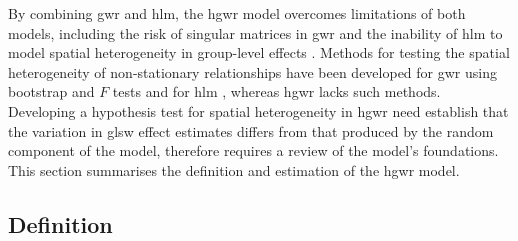 \documentclass[times]{interact}
\theoremstyle{plain}%
\theoremstyle{definition}
\theoremstyle{remark}
\begin{document}
By combining \gls{gwr} and \gls{hlm}, the \gls{hgwr} model overcomes limitations of both models, including the risk of singular matrices in \gls{gwr} and the inability of \gls{hlm} to model spatial heterogeneity in group-level effects \citep{HuHarris-2024}.
Methods for testing the spatial heterogeneity of non-stationary relationships have been developed for \gls{gwr} using bootstrap and $F$ tests \citep{LeungMei-2000,MeiXu-2016,HarrisBrunsdon-2017} and for \gls{hlm} \citep{GelmanHill-2006,Goldstein-2011}, whereas \gls{hgwr} lacks such methods.
Developing a hypothesis test for spatial heterogeneity in \gls{hgwr} need establish that the variation in \gls{glsw} effect estimates differs from that produced by the random component of the model,  therefore requires a review of the model's foundations.
This section summarises the definition and estimation of the \gls{hgwr} model.

\subsection{Definition}
\end{document}
